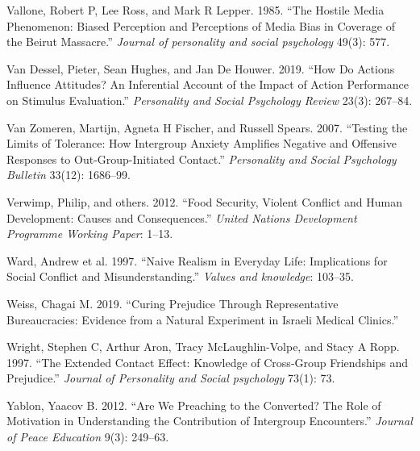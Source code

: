 \documentclass[11pt]{article}
\begin{document}
\leavevmode\hypertarget{ref-vallone1985hostileMedia}{}%
Vallone, Robert P, Lee Ross, and Mark R Lepper. 1985. ``The Hostile
Media Phenomenon: Biased Perception and Perceptions of Media Bias in
Coverage of the Beirut Massacre.'' \emph{Journal of personality and
social psychology} 49(3): 577.

\leavevmode\hypertarget{ref-van2019actions}{}%
Van Dessel, Pieter, Sean Hughes, and Jan De Houwer. 2019. ``How Do
Actions Influence Attitudes? An Inferential Account of the Impact of
Action Performance on Stimulus Evaluation.'' \emph{Personality and
Social Psychology Review} 23(3): 267--84.

\leavevmode\hypertarget{ref-van2007testing}{}%
Van Zomeren, Martijn, Agneta H Fischer, and Russell Spears. 2007.
``Testing the Limits of Tolerance: How Intergroup Anxiety Amplifies
Negative and Offensive Responses to Out-Group-Initiated Contact.''
\emph{Personality and Social Psychology Bulletin} 33(12): 1686--99.

\leavevmode\hypertarget{ref-verwimp2012food}{}%
Verwimp, Philip, and others. 2012. ``Food Security, Violent Conflict and
Human Development: Causes and Consequences.'' \emph{United Nations
Development Programme Working Paper}: 1--13.

\leavevmode\hypertarget{ref-ward1997naive}{}%
Ward, Andrew et al. 1997. ``Naive Realism in Everyday Life: Implications
for Social Conflict and Misunderstanding.'' \emph{Values and knowledge}:
103--35.

\leavevmode\hypertarget{ref-weiss2019curing}{}%
Weiss, Chagai M. 2019. ``Curing Prejudice Through Representative
Bureaucracies: Evidence from a Natural Experiment in Israeli Medical
Clinics.''

\leavevmode\hypertarget{ref-wright1997extended}{}%
Wright, Stephen C, Arthur Aron, Tracy McLaughlin-Volpe, and Stacy A
Ropp. 1997. ``The Extended Contact Effect: Knowledge of Cross-Group
Friendships and Prejudice.'' \emph{Journal of Personality and Social
psychology} 73(1): 73.

\leavevmode\hypertarget{ref-yablon2012we}{}%
Yablon, Yaacov B. 2012. ``Are We Preaching to the Converted? The Role of
Motivation in Understanding the Contribution of Intergroup Encounters.''
\emph{Journal of Peace Education} 9(3): 249--63.
\end{document}
